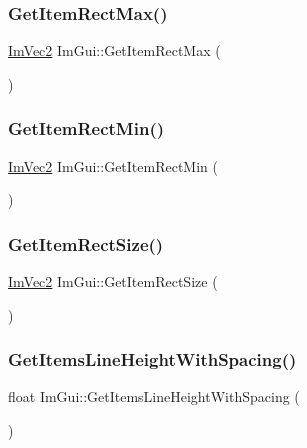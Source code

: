 \subsubsection{\texorpdfstring{Get\+Item\+Rect\+Max()}{GetItemRectMax()}}
{\footnotesize\ttfamily \mbox{\hyperlink{struct_im_vec2}{Im\+Vec2}} Im\+Gui\+::\+Get\+Item\+Rect\+Max (\begin{DoxyParamCaption}{ }\end{DoxyParamCaption})}

\mbox{\label{namespace_im_gui_a65b24b72ec0e8444c705cebf3e91f570}} 
\subsubsection{\texorpdfstring{Get\+Item\+Rect\+Min()}{GetItemRectMin()}}
{\footnotesize\ttfamily \mbox{\hyperlink{struct_im_vec2}{Im\+Vec2}} Im\+Gui\+::\+Get\+Item\+Rect\+Min (\begin{DoxyParamCaption}{ }\end{DoxyParamCaption})}

\mbox{\label{namespace_im_gui_a3303d1c37041307e11fd46fc43b2274d}} 
\subsubsection{\texorpdfstring{Get\+Item\+Rect\+Size()}{GetItemRectSize()}}
{\footnotesize\ttfamily \mbox{\hyperlink{struct_im_vec2}{Im\+Vec2}} Im\+Gui\+::\+Get\+Item\+Rect\+Size (\begin{DoxyParamCaption}{ }\end{DoxyParamCaption})}

\mbox{\label{namespace_im_gui_a85a5202a65c0663858dba55a206761c5}} 
\subsubsection{\texorpdfstring{Get\+Items\+Line\+Height\+With\+Spacing()}{GetItemsLineHeightWithSpacing()}}
{\footnotesize\ttfamily float Im\+Gui\+::\+Get\+Items\+Line\+Height\+With\+Spacing (\begin{DoxyParamCaption}{ }\end{DoxyParamCaption})}

